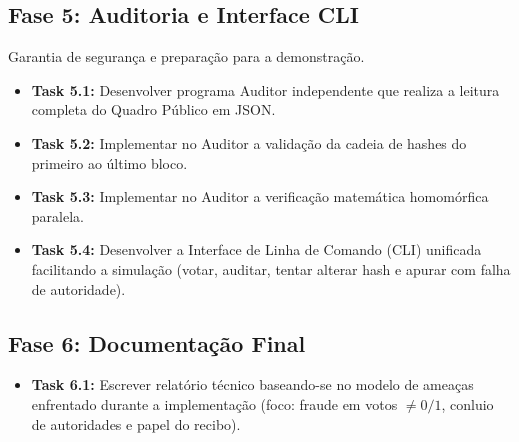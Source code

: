 \documentclass[12pt, a4paper]{article}
\begin{document}
\subsection{Fase 5: Auditoria e Interface CLI}
Garantia de segurança e preparação para a demonstração.
\begin{itemize}[label=$\square$]
    \item \textbf{Task 5.1:} Desenvolver programa Auditor independente que realiza a leitura completa do Quadro Público em JSON.
    \item \textbf{Task 5.2:} Implementar no Auditor a validação da cadeia de hashes do primeiro ao último bloco.
    \item \textbf{Task 5.3:} Implementar no Auditor a verificação matemática homomórfica paralela.
    \item \textbf{Task 5.4:} Desenvolver a Interface de Linha de Comando (CLI) unificada facilitando a simulação (votar, auditar, tentar alterar hash e apurar com falha de autoridade).
\end{itemize}

\subsection{Fase 6: Documentação Final}
\begin{itemize}[label=$\square$]
    \item \textbf{Task 6.1:} Escrever relatório técnico baseando-se no modelo de ameaças enfrentado durante a implementação (foco: fraude em votos $\neq 0/1$, conluio de autoridades e papel do recibo).
\end{itemize}
\end{document}

